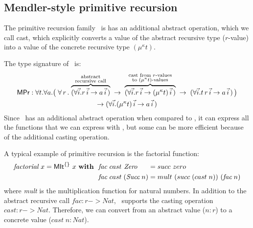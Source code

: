 \subsection{Mendler-style primitive recursion}\label{sec:mendler:pr}
The primitive recursion family \MPr\ is has an additional abstract operation,
which we call cast, which explicitly converts
a value of the abstract recursive type ($r$-value) into
a value of the concrete recursive type $(\mu^\kappa t)$.

The type signature of \MPr\ is:
\begin{multline*}
 \textsf{MPr} : \forall t . \forall a .
   \big(\; \forall\, r\, . \;
         \overset{\begin{smallmatrix}
                        \text{abstract} \\
                        \text{recursive call}
                       \end{smallmatrix}}{\overbrace{
            (\forall\vec{i} . r\,\vec{i} -> a\,\vec{i}\,) }} \;
   -> \; \overset{\begin{smallmatrix}
                        \text{cast from $r$-values} \\
                        \text{to $(\mu^\kappa t)$-values} \\
                       \end{smallmatrix}}{\overbrace{
            (\forall\vec{i} . r\,\vec{i} -> (\mu^\kappa t)\,\vec{i}\,) }} \;
   -> \;    (\forall\vec{i} . t\, r\,\vec{i} -> a\,\vec{i}\,) \,
   \big) \\
 -> (\forall\vec{i} . (\mu^\kappa t)\,\vec{i} -> a\,\vec{i}\,)
\end{multline*}
Since \MPr\ has an additional abstract operation when compared
to \MIt, it can express all the functions
that we can express with \MIt, but some can be more efficient because of the
additional casting operation.

A typical example of primitive recursion is the factorial function:
\begin{align*}
\textit{factorial}~x = \textsf{MIt}^{\{\}}~x~\textbf{with}~~
&  \textit{fac} ~cast ~\textit{Zero}~~~~\; = succ~zero \\
&  \textit{fac} ~cast \;(\textit{Succ}\;n) = mult~(succ\;(cast\;n))~(\textit{fac}\;n)
\end{align*}
where \textit{mult} is the multiplication function for natural numbers.
In addition to the abstract recursive call $\textit{fac} : r -> \textit{Nat}$,
\MPr\ supports the casting operation $cast : r -> \textit{Nat}$.
Therefore, we can convert from an abstract value ($n : r$) to
a concrete value ($cast\;n : \textit{Nat}$).

